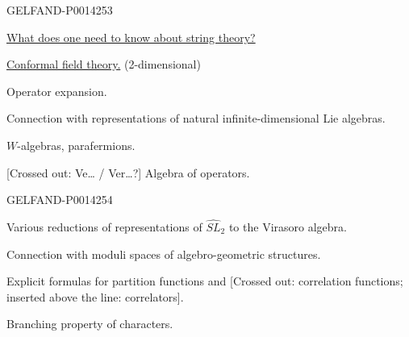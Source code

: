 \begin{GelfandAdjacentEvidence}{GELFAND-P001425}{3}


\qquad \uline{What does one need to know about string theory?}

\uline{Conformal field theory.} \quad (2-dimensional)

Operator expansion.

Connection with representations of natural infinite-dimensional Lie algebras.

\(W\)-algebras, parafermions.

[Crossed out: Ve\ldots{} / Ver\ldots{}?] Algebra of  operators.
\end{GelfandAdjacentEvidence}
\begin{GelfandAdjacentEvidence}{GELFAND-P001425}{4}

\end{GelfandAdjacentEvidence}


Various reductions of representations of \(\widehat{SL}_2\) to the Virasoro algebra.

Connection with moduli spaces of algebro-geometric structures.

Explicit formulas for partition functions and [Crossed out: correlation functions; inserted above the line: correlators].

Branching property of characters.


